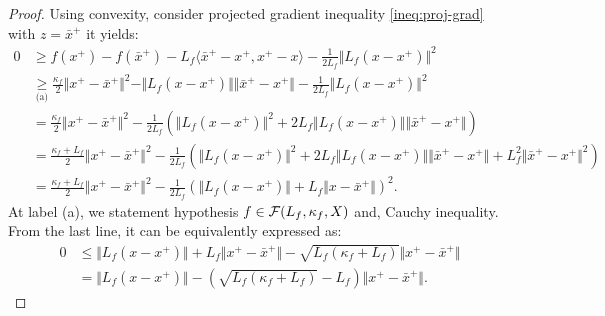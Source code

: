 \documentclass[12pt]{report}
\begin{document}
            \begin{proof}
                Using convexity, consider projected gradient inequality \eqref{ineq:proj-grad} with $z = \bar x^+$ it yields: 
                {\small
                \begin{align*}
                    0 &\ge 
                    f(x^+) - f(\bar x^+) - L_f\langle \bar x^+ - x^+, x^+ - x\rangle
                    - \frac{1}{2L_f}\Vert L_f(x - x^+)\Vert^2
                    \\
                    &\underset{\text{(a)}}\ge
                    \frac{\kappa_f}{2}\Vert x^+ - \bar x^+\Vert^2
                    - \Vert L_f(x - x^+)\Vert\Vert \bar x^+ - x^+\Vert
                    - \frac{1}{2L_f}\Vert L_f(x - x^+)\Vert^2 
                    \\
                    &= \frac{\kappa_f}{2}\Vert x^+ - \bar x^+\Vert^2
                    - \frac{1}{2L_f}\left(
                        \Vert L_f(x - x^+)\Vert^2
                        + 2L_f\Vert L_f(x - x^+)\Vert\Vert \bar x^+ - x^+\Vert
                    \right)
                    \\
                    &= \frac{\kappa_f + L_f}{2}\Vert x^+ - \bar x^+\Vert^2
                    - \frac{1}{2L_f}\left(
                        \Vert L_f(x - x^+)\Vert^2
                        + 2L_f\Vert L_f(x - x^+)\Vert\Vert \bar x^+ - x^+\Vert
                        + L_f^2\Vert\bar x^+ - x^+\Vert^2
                    \right)
                    \\
                    &= 
                    \frac{\kappa_f + L_f}{2}\Vert x^+ - \bar x^+\Vert^2
                    - \frac{1}{2L_f}\left(
                        \Vert L_f(x - x^+)\Vert + L_f\Vert x - \bar x^+\Vert
                    \right)^2.
                \end{align*}
                }
                At label (a), we statement hypothesis $f \in \mathcal F (L_f, \kappa_f, X)$ and, Cauchy inequality. 
                From the last line, it can be equivalently expressed as:
                \begin{align*}
                    0 &\le
                    \Vert L_f(x - x^+)\Vert + L_f\Vert x^+ - \bar x^+\Vert
                    - \sqrt{L_f(\kappa_f + L_f)}\Vert x^+ - \bar x^+\Vert
                    \\
                    &=
                    \Vert L_f(x - x^+)\Vert
                    - \left(\sqrt{L_f(\kappa_f + L_f)} - L_f\right)\Vert x^+ - \bar x^+\Vert.
                \end{align*}
            \end{proof}
\end{document}
